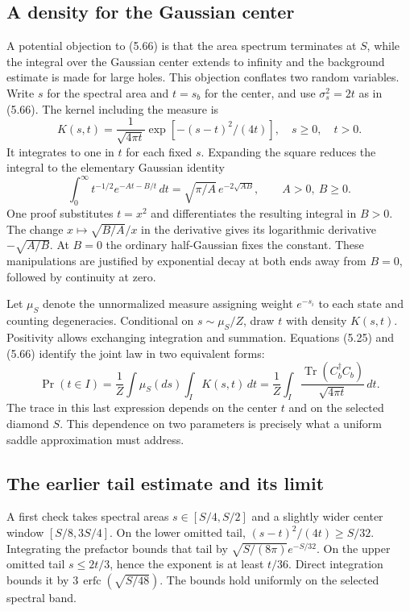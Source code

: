 \documentclass[11pt]{article}
\newcommand{\Tr}{\operatorname{Tr}}
\newcommand{\Prob}{\operatorname{Pr}}
\begin{document}
\subsection{A density for the Gaussian center}
A potential objection to (5.66) is that the area spectrum terminates at $S$, while the integral over the Gaussian center extends to infinity and the background estimate is made for large holes. This objection conflates two random variables. Write $s$ for the spectral area and $t=s_b$ for the center, and use $\sigma_s^2=2t$ as in (5.66). The kernel including the measure is
\begin{equation}\label{eq:kernel}
 K(s,t)=\frac{1}{\sqrt{4\pi t}}\exp[-(s-t)^2/(4t)],\quad s\ge0,\quad t>0 .
\end{equation}
It integrates to one in $t$ for each fixed $s$. Expanding the square reduces the integral to the elementary Gaussian identity
\[
 \int_0^\infty t^{-1/2}e^{-At-B/t}\,dt
     =\sqrt{\pi/A}\,e^{-2\sqrt{AB}},\qquad A>0,\ B\ge0 .
\]
One proof substitutes $t=x^2$ and differentiates the resulting integral in $B>0$. The change $x\mapsto\sqrt{B/A}/x$ in the derivative gives its logarithmic derivative $-\sqrt{A/B}$. At $B=0$ the ordinary half-Gaussian fixes the constant. These manipulations are justified by exponential decay at both ends away from $B=0$, followed by continuity at zero.

Let $\mu_S$ denote the unnormalized measure assigning weight $e^{-s_i}$ to each state and counting degeneracies. Conditional on $s\sim\mu_S/Z$, draw $t$ with density $K(s,t)$. Positivity allows exchanging integration and summation. Equations (5.25) and (5.66) identify the joint law in two equivalent forms:
\[
 \Prob(t\in I)=\frac{1}{Z}\int\mu_S(ds)\int_I K(s,t)\,dt
   =\frac{1}{Z}\int_I\frac{\Tr(C_b^\dagger C_b)}{\sqrt{4\pi t}}\,dt .
\]
The trace in this last expression depends on the center $t$ and on the selected diamond $S$. This dependence on two parameters is precisely what a uniform saddle approximation must address.

\subsection{The earlier tail estimate and its limit}
A first check takes spectral areas $s\in[S/4,S/2]$ and a slightly wider center window $[S/8,3S/4]$. On the lower omitted tail, $(s-t)^2/(4t)\ge S/32$. Integrating the prefactor bounds that tail by $\sqrt{S/(8\pi)}e^{-S/32}$. On the upper omitted tail $s\le2t/3$, hence the exponent is at least $t/36$. Direct integration bounds it by $3\,\operatorname{erfc}(\sqrt{S/48})$. The bounds hold uniformly on the selected spectral band.
\end{document}
